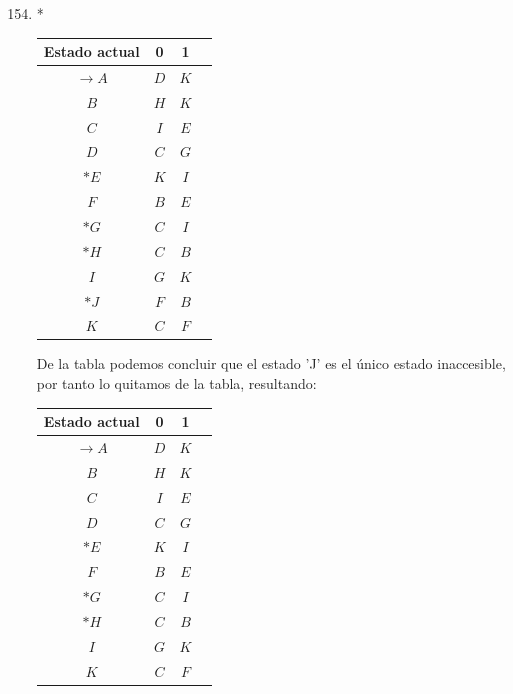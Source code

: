 \documentclass[12pt]{article}
\begin{document}
\newpage
\begin{enumerate}
    \setcounter{enumi}{153}
		\item *
		\begin{center}
		\begin{minipage}{0.45\textwidth}
			\begin{center}
			\begin{tabular}{c|ccc}
			Estado actual & 0 & 1\\
			\hline
			$\rightarrow A$ & $D$ & $K$\\
			$B$ & $H$ & $K$\\
			$C$ & $I$ & $E$\\
			$D$ & $C$ & $G$\\
			$*E$ & $K$ & $I$\\
			$F$ & $B$ & $E$\\
            $*G$ & $C$ & $I$\\
            $*H$ & $C$ & $B$\\
            $I$ & $G$ & $K$\\
            $*J$ & $F$ & $B$\\
            $K$ & $C$ & $F$\\
		      \end{tabular}
		      \end{center}
		De la tabla podemos concluir que el estado 'J' es el único estado inaccesible, por tanto lo quitamos de la tabla, resultando:
		\end{minipage}
        \hfill
        \begin{minipage}{0.45\textwidth}
		      \begin{center}
			\begin{tabular}{c|cc l}
			Estado actual & 0 & 1\\
			\hline
			$\rightarrow A$ & $D$ & $K$\\
			$B$ & $H$ & $K$\\
			$C$ & $I$ & $E$\\
			$D$ & $C$ & $G$\\
			$*E$ & $K$ & $I$\\
			$F$ & $B$ & $E$\\
            $*G$ & $C$ & $I$\\
            $*H$ & $C$ & $B$\\
            $I$ & $G$ & $K$\\
            $K$ & $C$ & $F$\\
		      \end{tabular}
		      \end{center}

\end{minipage}
\end{center}
\end{enumerate}
\end{document}
